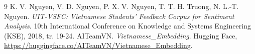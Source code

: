 \begin{thebibliography}{9}
 K. V. Nguyen, V. D. Nguyen, P. X. V. Nguyen, T. T. H. Truong, N. L.-T. Nguyen.
  \textit{UIT-VSFC: Vietnamese Students' Feedback Corpus for Sentiment Analysis}. 10th International Conference on
  Knowledge and Systems Engineering (KSE), 2018, tr. 19-24.
 AITeamVN. \textit{Vietnamese\_Embedding}. Hugging Face, \url{https://huggingface.co/AITeamVN/Vietnamese_Embedding}.
\end{thebibliography}
